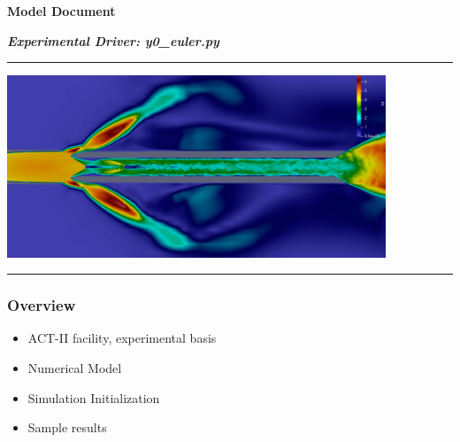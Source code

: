 \documentclass{beamer}
\begin{document}
  
\begin{frame}\frametitle{}

\vspace*{0.2in}

\centerline{\textrm{{\huge\bfseries\color{myOrange} Model Document}}} 
\smallskip
\centerline{\textrm{{\large\bfseries\color{myOrange} \textit{Experimental Driver: y0\_euler.py}}}} 

\vspace*{0.2in}
\hrule
\begin{center}
\includegraphics[width=0.85\textwidth]{Figures/TitleFig.pdf}
\end{center}
\hrule

\vspace*{0.1in}
\hfill{}

\end{frame}







\begin{frame}\frametitle{Overview}

\begin{itemize}

\item ACT-II facility, experimental basis
\item Numerical Model
\item Simulation Initialization
\item Sample results

\end{itemize}

\end{frame}
\end{document}
